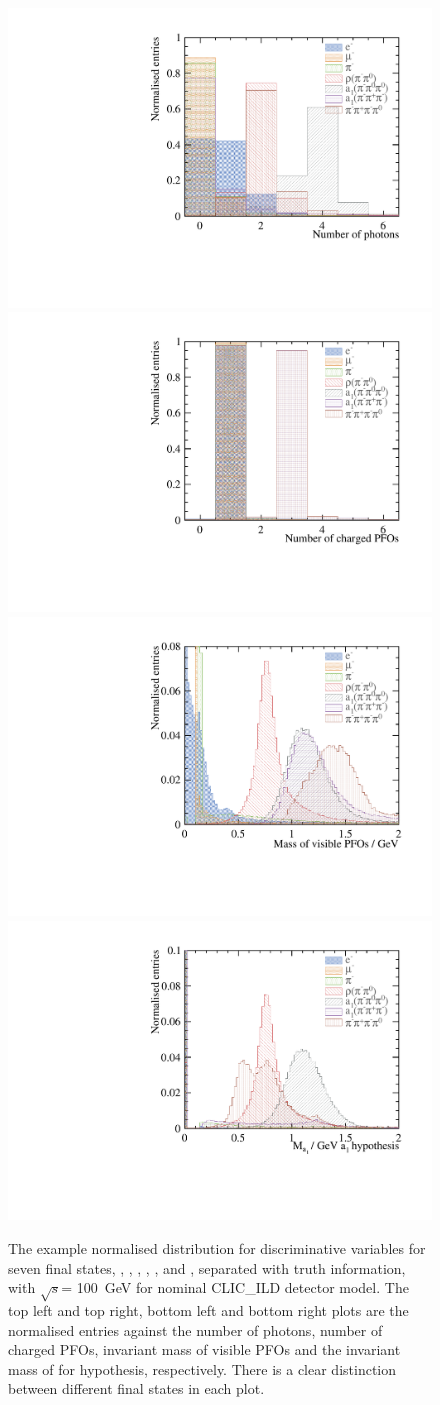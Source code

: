 \documentclass[a4paper,11pt]{article}
\newcommand{\decayElectron}{\Pem\PAGne\PGnGt}
\newcommand{\decayMuon}{\PGpm\PAGnGm\PGnGt}
\newcommand{\decayPion}{\PGpm\PGnGt}
\newcommand{\decayRho}{\PGrP{\PGpm\PGpz}\PGnGt}
\newcommand{\decayAiPhoton}{\PaDoP{\PGpm\PGpz\PGpz}\PGnGt}
\newcommand{\decayAiPion}{\PaDoP{\PGpm\PGpm\PGpp}\PGnGt}
\newcommand{\decayThreePionPhoton}{\PGpm\PGpm\PGpp\PGnGt}
\newcommand{\decayAiPhotonShort}{\PaDoP{\PGpm\PGpz\PGpz}}
\newcommand{\rootS}{\ensuremath{\sqrt{s}}}
\begin{document}
\begin{figure}[htbp]
\centering %

\includegraphics[width=.45\textwidth]{plots/var/nPhoton_100GeV_improved} 
\qquad
\includegraphics[width=.45\textwidth]{plots/var/nCharge_100GeV_improved} 
\qquad
\includegraphics[width=.45\textwidth]{plots/var/mVis_100GeV_improved_zoom}
\qquad
\includegraphics[width=.45\textwidth]{plots/var/mA1A1Fit_100GeV_improved_zoom}
\qquad

\caption{\label{fig:nPfos} 
The example normalised distribution for discriminative variables for seven final states, \decayElectron, \decayMuon, \decayPion, \decayRho, \decayAiPhoton, \decayAiPion and \decayThreePionPhoton, separated with truth information,  with \rootS = 100 \,GeV for nominal CLIC\_ILD detector model. The top left and top right, bottom left and bottom right plots are the normalised entries against the number of photons, number of charged PFOs, invariant mass of visible PFOs and the invariant mass of \decayAiPhotonShort for \decayAiPhotonShort hypothesis, respectively. There is a clear distinction between different final states in each plot.
}
\end{figure}
\end{document}

